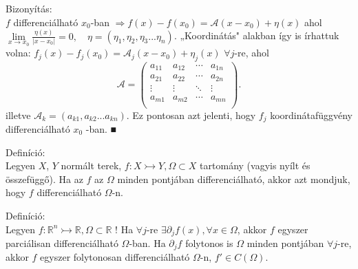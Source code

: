 \documentclass[12pt,a4paper]{scrartcl}
\newenvironment{definicio}{}{}
\newenvironment{bizonyitas}{}{}
\begin{document}
\begin{bizonyitas}

Bizonyítás:\\
\(f\) differenciálható \(x_{0}\)-ban
\(\left. \Rightarrow f\left( x \right) - f\left( x_{0} \right) = \mathcal{A}\left( {x - x_{0}} \right) + \eta\left( x \right) \right.\)
ahol
\(\underset{x\rightarrow x_{0}}{\lim}\frac{\eta\left( x \right)}{\left| {x - x_{0}} \right|} = 0,\quad\eta = \left( {\eta_{1},\eta_{2},\eta_{3}...\eta_{n}} \right)\).
„Koordinátás" alakban így is írhattuk volna:
\(f_{j}\left( x \right) - f_{j}\left( x_{0} \right) = \mathcal{A}_{j}\left( {x - x_{0}} \right) + \eta_{j}\left( x \right)\)
\(\forall j\)-re, ahol \[{\mathcal{A} = \left( \begin{array}{llll}
a_{11} & a_{12} & \cdots & a_{1n} \\
a_{21} & a_{22} & \cdots & a_{2n} \\
 \vdots & \vdots & \ddots & \vdots \\
a_{m1} & a_{m2} & \cdots & a_{mn} \\
\end{array} \right)}.\] illetve
\(\mathcal{A}_{k} = \left( {a_{k1},a_{k2}...a_{kn}} \right)\). Ez
pontosan azt jelenti, hogy \(f_{j}\) koordinátafüggvény differenciálható
\(x_{0}\) -ban. ■

\end{bizonyitas}

\begin{definicio}

Definíció:\\
Legyen \(X\), \(Y\) normált terek,
\(\left. f:X\rightarrowtail Y,\Omega \subset X \right.\) tartomány
(vagyis nyílt és összefüggő). Ha az \(f\) az \(\Omega\) minden pontjában
differenciálható, akkor azt mondjuk, hogy \(f\) differenciálható
\(\Omega\)-n.

\end{definicio}

\begin{definicio}

Definíció:\\
Legyen
\(\left. f:{\mathbb{R}}^{n}\rightarrowtail{\mathbb{R}},\Omega \subset {\mathbb{R}} \right.\)
! Ha \(\forall j\)-re
\(\exists\partial_{j}f\left( x \right),\forall x \in \Omega\), akkor
\(f\) egyszer parciálisan differenciálható \(\Omega\)-ban. Ha
\(\partial_{j}f\) folytonos is \(\Omega\) minden pontjában
\(\forall j\)-re, akkor \(f\) egyszer folytonosan differenciálható
\(\Omega\)-n, \(f' \in C\left( \Omega \right)\).

\end{definicio}
\end{document}
